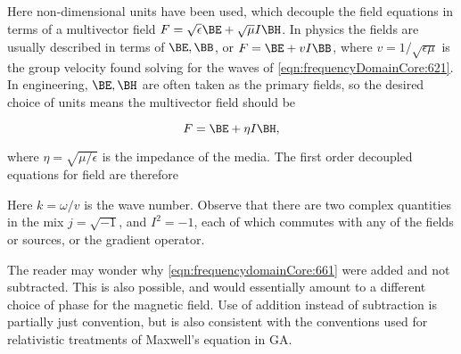 Here non-dimensional units have been used, which decouple the field equations in terms of a multivector field \( F = \sqrt{\epsilon} \BE + \sqrt{\mu} I \BH \).
In physics the fields are usually described in terms of \( \BE, \BB \), or \( F = \BE + v I \BB \), where \( v = 1/\sqrt{\epsilon\mu} \) is the group velocity found solving for the waves of \cref{eqn:frequencyDomainCore:621}.  In engineering, \( \BE, \BH \) are often taken as the primary fields, so the desired choice of units means the multivector field should be

\begin{dmath}\label{eqn:frequencydomainCore:80}
F = \BE + \eta I \BH,
\end{dmath}

where \( \eta = \sqrt{\mu/\epsilon} \) is the impedance of the media.  The first order decoupled equations for field are therefore


Here \( k = \omega/v \) is the wave number.
Observe that there are two complex quantities in the mix \( j = \sqrt{-1} \), and \( I^2 = -1 \), each of which commutes with any of the fields or sources, or the gradient operator.

The reader may wonder why \cref{eqn:frequencydomainCore:661} were added and not subtracted.  This is also possible, and would essentially amount to a different choice of phase for the magnetic field.  Use of addition instead of subtraction is partially just convention, but is also consistent with the conventions used for relativistic treatments of Maxwell's equation in GA.

